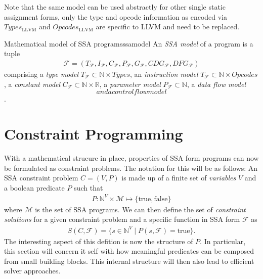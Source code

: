     Note that the same model can be used abstractly for other single static
    assignment forms, only the type and opcode information as encoded via
    $Types_\text{LLVM}$ and $Opcodes_\text{LLVM}$ are specific to LLVM and need
    to be replaced.

\begin{definition}{Mathematical model of SSA programs}{ssamodel}
    An {\em SSA model} of a program is a tuple
    \begin{align*}
        \mathcal{F}=(T_\mathcal{F},I_\mathcal{F},C_\mathcal{F},P_\mathcal{F},G_\mathcal{F},CDG_\mathcal{F},DFG_\mathcal{F})
    \end{align*}
    comprising a {\em type model}
    $T_\mathcal F\subset\mathbb N\times Types$,
    an {\em instruction model}
    $T_\mathcal F\subset\mathbb N\times Opcodes$,
    a {\em constant model}
    $C_\mathcal F\subset\mathbb N\times\mathbb R$,
    a {\em parameter model}
    $P_\mathcal F\subset\mathbb N$,
    a {\em data flow model}
    $$ and a control flow model $$.

\end{definition}


\section{Constraint Programming}

    With a mathematical strucure in place, properties of SSA form programs can
    now be formulated as constraint problems.
    The notation for this will be as follows: An SSA constraint problem
    $C=(V,P)$ is made up of a finite set of {\em variables} $V$ and a boolean
    predicate $P$ such that
    \begin{align*}
        P\colon\mathbb N^V\times\mathcal M\mapsto\{\text{true}, \text{false}\}
    \end{align*}
    where $\mathcal M$ is the set of SSA programs.
    We can then define the set of {\em constraint solutions} for a given
    constraint problem and a specific function in SSA form $\mathcal F$ as
    \begin{align*}
        S(C, \mathcal F) = \{s\in\mathbb N^V\mid P(s,\mathcal F)=\text{true}\}.
    \end{align*}
    The interesting aspect of this defition is now the structure of $P$.
    In particular, this section will concern it self with how meaningful
    predicates can be composed from small building blocks.
    This internal structure will then also lead to efficient solver approaches.

